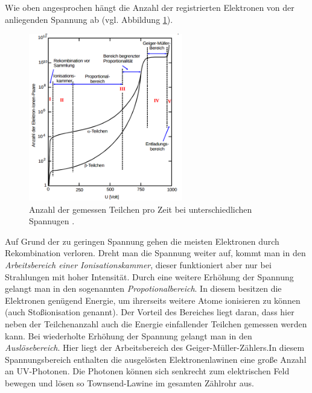 Wie oben angesprochen hängt die Anzahl der registrierten
Elektronen von der anliegenden Spannung ab (vgl. Abbildung \ref{fig:teilchen_spannung}).
\begin{figure}
  \centering
  \includegraphics[width=0.6\textwidth]{bilder/diagramm.png}
  \caption{Anzahl der gemessen Teilchen pro Zeit bei unterschiedlichen Spannugen \cite{anleitung703}.}
  \label{fig:teilchen_spannung}
\end{figure}
Auf Grund der zu geringen Spannung gehen die meisten Elektronen durch Rekombination verloren. Dreht man die Spannung weiter auf,
kommt man in den \emph{Arbeitsbereich einer Ionisationskammer}, dieser funktioniert aber nur bei
Strahlungen mit hoher Intensität. Durch eine weitere Erhöhung der Spannung gelangt man
in den sogenannten \emph{Propotionalbereich}. In diesem besitzen die Elektronen
genügend Energie, um ihrerseits weitere Atome ionisieren zu können (auch Stoßionisation genannt).
Der Vorteil des Bereiches liegt daran, dass hier neben der Teilchenanzahl auch die Energie
einfallender Teilchen gemessen werden kann. Bei wiederholte Erhöhung der Spannung
gelangt man in den \emph{Auslösebereich}. Hier liegt der Arbeitsbereich des
Geiger-Müller-Zählers.In diesem Spannungsbereich enthalten die ausgelösten Elektronenlawinen
eine große Anzahl an UV-Photonen. Die Photonen können sich senkrecht zum elektrischen Feld bewegen
und lösen so Townsend-Lawine im gesamten Zählrohr aus.

